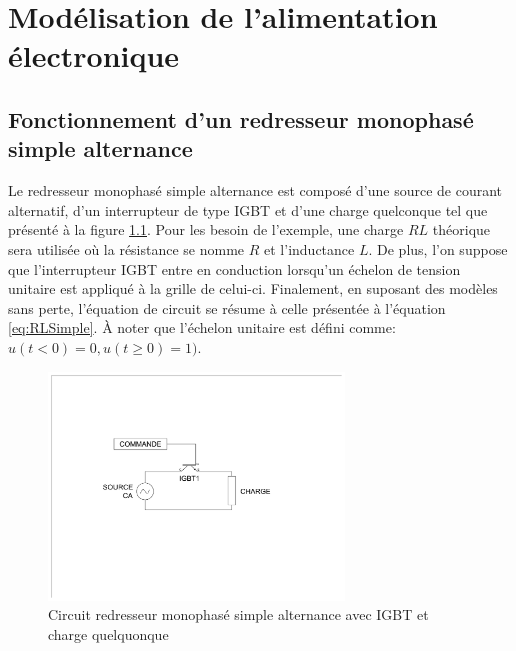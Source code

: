 


\chapter{Modélisation de l'alimentation électronique}
\section{Fonctionnement d'un redresseur monophasé simple alternance}
Le redresseur monophasé simple alternance est composé d'une source de courant alternatif, d'un interrupteur de type IGBT et d'une charge quelconque tel que présenté à la figure \ref{fig:RedresseurMonophaseSimpleAlternanceIGBT}. Pour les besoin de l'exemple, une charge $RL$ théorique sera utilisée où la résistance se nomme $R$ et l'inductance $L$. De plus, l'on suppose que l'interrupteur IGBT entre en conduction lorsqu'un échelon de tension unitaire est appliqué à la grille de celui-ci. Finalement, en suposant des modèles sans perte, l'équation de circuit se résume à celle présentée à l'équation \ref{eq:RLSimple}. À noter que l'échelon unitaire est défini comme: $u(t<0) = 0, u(t\geq 0) = 1)$.

\begin{figure}[htb!]
	\begin{center}  
		\includegraphics[width=0.7\textwidth]{Circuit/RedresseurMonophaseSimpleAlternanceIGBT}
		\caption{Circuit redresseur monophasé simple alternance avec IGBT et charge quelquonque}
		\label{fig:RedresseurMonophaseSimpleAlternanceIGBT}
	\end{center}   
\end{figure}


